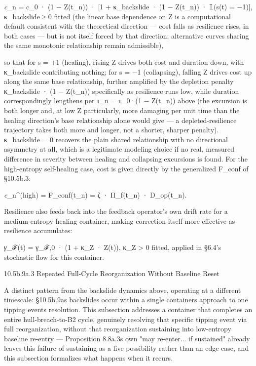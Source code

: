 \documentclass[
]{article}
\begin{document}
\emph{c}\_n = c\_0 · (1 − Z(t\_n)) · {[}1 + κ\_backslide · (1 − Z(t\_n))
· 𝟙(s(t) = −1){]}, κ\_backslide ≥ 0 fitted (the linear base dependence
on Z is a computational default consistent with the theoretical
direction --- cost falls as resilience rises, in both cases --- but is
not itself forced by that direction; alternative curves sharing the same
monotonic relationship remain admissible),

so that for s = +1 (healing), rising Z drives both cost and duration
down, with κ\_backslide contributing nothing; for s = −1 (collapsing),
falling Z drives cost up along the same base relationship, further
amplified by the depletion penalty κ\_backslide · (1 − Z(t\_n))
specifically as resilience runs low, while duration correspondingly
lengthens per τ\_n = τ\_0·(1 − Z(t\_n)) above (the excursion is both
longer and, at low Z particularly, more damaging per unit time than the
healing direction's base relationship alone would give --- a
depleted-resilience trajectory takes both more and longer, not a
shorter, sharper penalty). κ\_backslide = 0 recovers the plain shared
relationship with no directional asymmetry at all, which is a legitimate
modeling choice if no real, measured difference in severity between
healing and collapsing excursions is found. For the high-entropy
self-healing case, cost is given directly by the generalized F\_conf of
§10.5b.3:

\emph{c}\_n\^{}(high) = F\_conf(t\_n) = ζ · Π\_f(t\_n) · D\_op(t\_n).

Resilience also feeds back into the feedback operator's own drift rate
for a medium-entropy healing container, making correction itself more
effective as resilience accumulates:

\emph{γ}\_ℱ(t) = γ\_ℱ,0 · (1 + κ\_Z · Z(t)), κ\_Z \textgreater{} 0
fitted, applied in §6.4's stochastic flow for this container.

10.5b.9a.3 Repeated Full-Cycle Reorganization Without Baseline Reset

A distinct pattern from the backslide dynamics above, operating at a
different timescale: §10.5b.9as backslides occur within a single
containers approach to one tipping events resolution. This subsection
addresses a container that completes an entire hull-breach-to-B2 cycle,
genuinely resolving that specific tipping event via full reorganization,
without that reorganization sustaining into low-entropy baseline
re-entry --- Proposition 8.8a.3s own "may re-enter... if sustained"
already leaves this failure of sustaining as a live possibility rather
than an edge case, and this subsection formalizes what happens when it
recurs.
\end{document}
